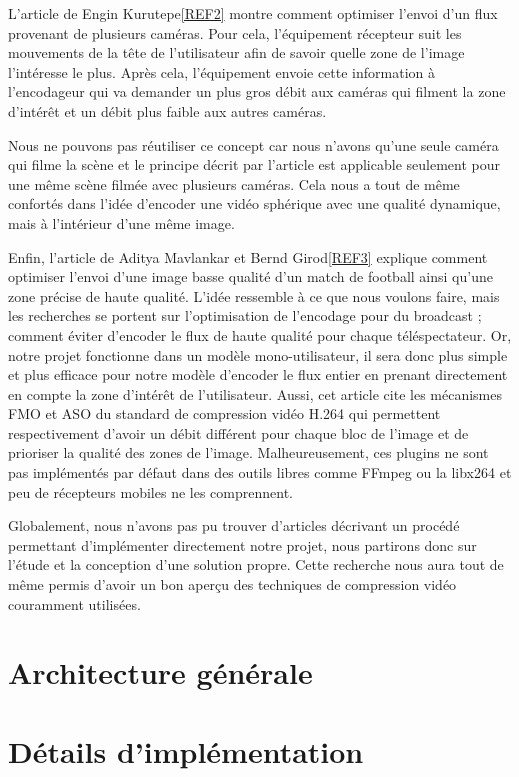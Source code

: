 \documentclass[11pt,a4paper]{article}
\begin{document}
\bigbreak
L'article de Engin Kurutepe\ref{REF2} montre comment optimiser l'envoi d'un flux provenant de plusieurs caméras.
Pour cela, l'équipement récepteur suit les mouvements de la tête de l'utilisateur afin de savoir quelle zone de l'image l'intéresse le plus.
Après cela, l'équipement envoie cette information à l'encodageur qui va demander un plus gros débit aux caméras qui filment la zone d'intérêt et un débit plus faible aux autres caméras.

Nous ne pouvons pas réutiliser ce concept car nous n'avons qu'une seule caméra qui filme la scène et le principe décrit par l'article est applicable seulement pour une même scène filmée avec plusieurs caméras.
Cela nous a tout de même confortés dans l'idée d'encoder une vidéo sphérique avec une qualité dynamique, mais à l'intérieur d'une même image.

\bigbreak
Enfin, l'article de Aditya Mavlankar et Bernd Girod\ref{REF3} explique comment optimiser l’envoi d’une image basse qualité d’un match de football ainsi qu’une zone précise de haute qualité.
L’idée ressemble à ce que nous voulons faire, mais les recherches se portent sur l’optimisation de l’encodage pour du broadcast ; comment éviter d’encoder le flux de haute qualité pour chaque téléspectateur.
Or, notre projet fonctionne dans un modèle mono-utilisateur, il sera donc plus simple et plus efficace pour notre modèle d’encoder le flux entier en prenant directement en compte la zone d'intérêt de l'utilisateur.
Aussi, cet article cite les mécanismes FMO et ASO du standard de compression vidéo H.264 qui permettent respectivement d’avoir un débit différent pour chaque bloc de l'image et de prioriser la qualité des zones de l’image.
Malheureusement, ces plugins ne sont pas implémentés par défaut dans des outils libres comme FFmpeg ou la libx264 et peu de récepteurs mobiles ne les comprennent.

\bigbreak
Globalement, nous n'avons pas pu trouver d'articles décrivant un procédé permettant d'implémenter directement notre projet, nous partirons donc sur l'étude et la conception d'une solution propre.
Cette recherche nous aura tout de même permis d'avoir un bon aperçu des techniques de compression vidéo couramment utilisées.


\section{Architecture générale}

\section{Détails d'implémentation}
\end{document}
